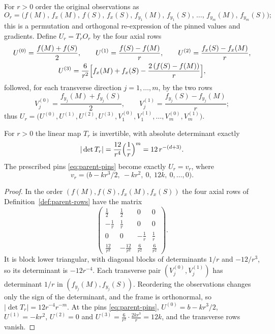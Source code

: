 \begin{definition}\label{def:parent-rows}
For $r>0$ order the original observations as
\[
O_r=\bigl(f(M),\,f_x(M),\,f(S),\,f_x(S),\,f_{y_1}(M),\,f_{y_1}(S),\,\dots,\,f_{y_m}(M),\,f_{y_m}(S)\bigr);
\]
this is a permutation and orthogonal re-expression of the pinned values and gradients. Define $U_r=T_rO_r$ by the four axial rows
\begin{equation}\label{eq:parent-rows}
\begin{gathered}
U^{(0)}=\frac{f(M)+f(S)}2,\qquad U^{(1)}=\frac{f(S)-f(M)}r,\qquad U^{(2)}=\frac{f_x(S)-f_x(M)}r,\\
U^{(3)}=\frac6{r^2}\Bigl[f_x(M)+f_x(S)-\frac{2\,(f(S)-f(M))}r\Bigr],
\end{gathered}
\end{equation}
followed, for each transverse direction $j=1,\dots,m$, by the two rows
\[
V^{(0)}_j=\frac{f_{y_j}(M)+f_{y_j}(S)}2,\qquad V^{(1)}_j=\frac{f_{y_j}(S)-f_{y_j}(M)}r ;
\]
thus $U_r=\bigl(U^{(0)},U^{(1)},U^{(2)},U^{(3)},V^{(0)}_1,V^{(1)}_1,\dots,V^{(0)}_m,V^{(1)}_m\bigr)$.
\end{definition}

\begin{lemma}\label{lem:parent-frame}
For $r>0$ the linear map $T_r$ is invertible, with absolute determinant exactly
\begin{equation}\label{eq:parent-detT}
|\det T_r|=\frac{12}{r^4}\Bigl(\frac1r\Bigr)^{m}=12\,r^{-(d+3)} .
\end{equation}
The prescribed pins \eqref{eq:parent-pins} become exactly $U_r=v_r$, where
\begin{equation}\label{eq:parent-target}
v_r=\bigl(b-kr^3/2,\ -kr^2,\ 0,\ 12k,\ 0,\dots,0\bigr).
\end{equation}
\end{lemma}

\begin{proof}
In the order $(f(M),f(S),f_x(M),f_x(S))$ the four axial rows of Definition~\ref{def:parent-rows} have the matrix
\[
\begin{pmatrix}\tfrac12&\tfrac12&0&0\\[2pt] -\tfrac1r&\tfrac1r&0&0\\[2pt] 0&0&-\tfrac1r&\tfrac1r\\[2pt] \tfrac{12}{r^3}&-\tfrac{12}{r^3}&\tfrac6{r^2}&\tfrac6{r^2}\end{pmatrix}.
\]
It is block lower triangular, with diagonal blocks of determinants $1/r$ and $-12/r^3$, so its determinant is $-12r^{-4}$. Each transverse pair $(V^{(0)}_j,V^{(1)}_j)$ has determinant $1/r$ in $(f_{y_j}(M),f_{y_j}(S))$. Reordering the observations changes only the sign of the determinant, and the frame is orthonormal, so $|\det T_r|=12r^{-4}r^{-m}$. At the pins \eqref{eq:parent-pins}, $U^{(0)}=b-kr^3/2$, $U^{(1)}=-kr^2$, $U^{(2)}=0$ and $U^{(3)}=\frac6{r^2}\cdot\frac{2kr^3}r=12k$, and the transverse rows vanish.
\end{proof}

